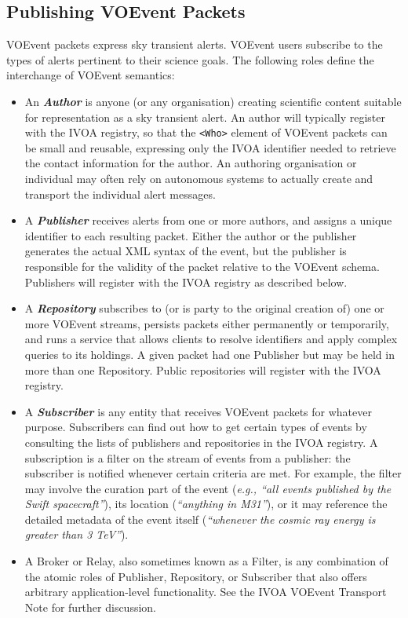 \documentclass[11pt,a4paper]{ivoa}
\begin{document}
\subsection{Publishing VOEvent Packets}
\label{sec:2.1}
VOEvent packets express sky transient alerts. VOEvent users subscribe to the
types of alerts pertinent to their science goals. The following roles define the
interchange of VOEvent semantics:
\begin{itemize}
\item An \emph{\bf Author} is anyone (or any organisation) creating scientific
content suitable for representation as a sky transient alert. An author will
typically register with the IVOA registry, so that the {\tt <Who>} element of
VOEvent packets can be small and reusable, expressing only the IVOA identifier
needed to retrieve the contact information for the author. An authoring
organisation or individual may often rely on autonomous systems to actually
create and transport the individual alert messages.
\item A \emph{\bf Publisher} receives alerts from one or more authors, and
assigns a unique identifier to each resulting packet. Either the author or the
publisher generates the actual XML syntax of the event, but the publisher is
responsible for the validity of the packet relative to the VOEvent schema.
Publishers will register with the IVOA registry as described below.
\item A \emph{\bf Repository} subscribes to (or is party to the original
creation of) one or more VOEvent streams, persists packets either permanently
or temporarily, and runs a service that allows clients to resolve identifiers
and apply complex queries to its holdings. A given packet had one Publisher but
may be held in more than one Repository. Public repositories will register with
the IVOA registry.
\item A \emph{\bf Subscriber} is any entity that receives VOEvent packets for
whatever purpose. Subscribers can find out how to get certain types of events
by consulting the lists of publishers and repositories in the IVOA registry.
A subscription is a filter on the stream of events from a publisher: the
subscriber is notified whenever certain criteria are met. For example, the
filter may involve the curation part of the event (\emph{e.g., ``all events
published by the Swift spacecraft''}), its location (\emph{``anything in
M31''}), or it may reference the detailed metadata of the event itself
(\emph{``whenever the cosmic ray energy is greater than 3 TeV''}).
\item A Broker or Relay, also sometimes known as a Filter, is any combination
of the atomic roles of Publisher, Repository, or Subscriber that also offers
arbitrary application-level functionality. See the IVOA VOEvent Transport Note
\citep{2011ivoa.spec.0711S} for further discussion.
\end{itemize}
\end{document}
